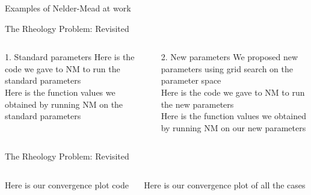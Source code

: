 \documentclass{beamer}
\begin{document}
\begin{frame}{Examples of Nelder-Mead at work}

\end{frame}


\begin{frame}{The Rheology Problem: Revisited}
	\begin{columns}
	\begin{column}{0.49\linewidth}
	\begin{block}{1. Standard parameters}
		Here is the code we gave to NM to run the standard parameters\\
		Here is the function values we obtained by running NM on the standard parameters
	\end{block}
	\end{column}
	\begin{column}{0.49\linewidth}
	\begin{block}{2. New parameters}
		We proposed new parameters using grid search on the parameter space\\
		Here is the code we gave to NM to run the new parameters\\
		Here is the function values we obtained by running NM on our new parameters
	\end{block}
	\end{column}
	\end{columns}
\end{frame}

\begin{frame}{The Rheology Problem: Revisited}
	\begin{columns}
	\begin{column}{0.39\linewidth}
		\centering
		Here is our convergence plot code
	\end{column}
	\begin{column}{0.59\linewidth}
		\centering
		Here is our convergence plot of all the cases
	\end{column}
	\end{columns}
\end{frame}
\end{document}
